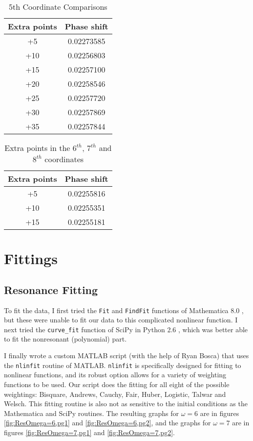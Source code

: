 \documentclass[Dissertation.tex]{subfiles}
\begin{document}
\begin{table}[H]
\centering
\begin{tabular}{c c}
\toprule
Extra points & Phase shift \\
\midrule
+5 & 0.02273585 \\
+10 & 0.02256803 \\
+15 & 0.02257100 \\
+20 & 0.02258546 \\
+25 & 0.02257720 \\
+30 & 0.02257869 \\
+35 & 0.02257844 \\
\bottomrule
\end{tabular}
\caption{5th Coordinate Comparisons}
\label{tab:5thcoordExtraPoints}
\end{table}


\begin{table}[H]
\centering
\begin{tabular}{c c}
\toprule
Extra points & Phase shift \\
\midrule
+5 & 0.02255816 \\
+10 & 0.02255351 \\
+15 & 0.02255181 \\
\bottomrule
\end{tabular}
\caption{Extra points in the $6^{th}$, $7^{th}$ and $8^{th}$ coordinates}
\label{tab:678thcoordExtraPoints}
\end{table}



\section{Fittings}
\label{sec:Fittings}

\subsection{Resonance Fitting}
\label{sec:ResonanceFit}
To fit the data, I first tried the \texttt{Fit} and \texttt{FindFit} functions of Mathematica\textsuperscript{\textregistered} 8.0 \cite{Mathematica}, but these were unable to fit our data to this complicated nonlinear function. I next tried the \texttt{curve\_fit} function of SciPy \cite{SciPy} in Python\textsuperscript{\textregistered} 2.6 \cite{Python}, which was better able to fit the nonresonant (polynomial) part.

I finally wrote a custom MATLAB\textsuperscript{\textregistered} \cite{matlab} script (with the help of Ryan Bosca) that uses the \texttt{nlinfit} routine of MATLAB. \texttt{nlinfit} is specifically designed for fitting to nonlinear functions, and its robust option allows for a variety of weighting functions to be used. Our script does the fitting for all eight of the possible weightings: Bisquare, Andrews, Cauchy, Fair, Huber, Logistic, Talwar and Welsch. This fitting routine is also not as sensitive to the initial conditions as the Mathematica and SciPy routines. The resulting graphs for $\omega = 6$ are in figures \ref{fig:ResOmega=6,pg1} and \ref{fig:ResOmega=6,pg2}, and the graphs for $\omega = 7$ are in figures \ref{fig:ResOmega=7,pg1} and \ref{fig:ResOmega=7,pg2}.
\end{document}
